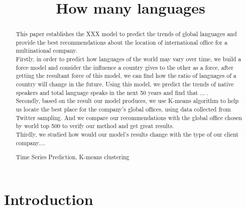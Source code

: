 \documentclass{mcmthesis}
\title {How many languages}
\date{}
\begin{document}
\begin{abstract}

  \indent This paper establishes the XXX model to predict the trends of global languages and provide the best recommendations about the location of international office for a multinational company.\\
  \indent Firstly, in order to predict how languages of the world may vary over time, we build a force model and consider the influence a country gives to the other as a force, after getting the resultant force of this model, we can find how the ratio of languages of a country will change in the future. Using this model, we predict the trends of native speakers and total language speaks in the next 50 years and find that ... .\\
  \indent Secondly, based on the result our model produces, we use K-means algorithm to help us locate the best place for the company's global offices, using data collected from Twitter sampling. And we compare our recommendations with the global office chosen by world top 500 to verify our method and get great results.\\
  \indent Thirdly, we studied how would our model's results change with the type of our client company....
\begin{keywords}
  Time Series Prediction, K-means clustering
\end{keywords}
\end{abstract}
\maketitle
\pagestyle{empty}
\newpage
\tableofcontents
\setmainfont{Times New Roman}
\newpage
\pagestyle{fancy}
\setcounter{page}{1}
\section{Introduction}
\end{document}

